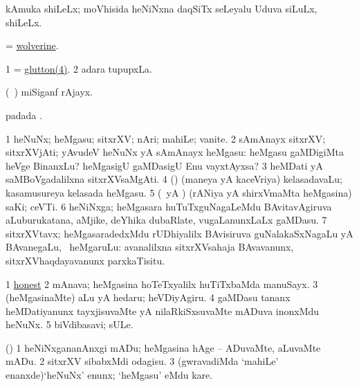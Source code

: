 \bentry
{} 
\gl{\nA}
\expl{}
\bmng
kAmuka shiLeLx; moVhisida heNiNxna daqSiTx seLeyalu Uduva siLuLx, shiLeLx. 
\emng
\eentry

\bentry
{} 
\gl{\nA}
\expl{}
\bmng
= \hyperlink{wolverine}{wolverine}. 
\emng
\eentry

\bentry
{} 
\gl{\nA}
\expl{}
\bmng
\bnum
\num{1} = \hyperref{kandict_g.pdf}{G}{glutton(4)}{glutton(4)}. 
\num{2} adara tupupxLa. 
\enum
\emng
\eentry

\bentry
{} 
\gl{\nA}
\expl{}
\bmng
(\kanu\ \ame) miSiganf rAjayx. 
\emng
\eentry

\bentry
{} 
\gl{\nA}
\expl{}
\bmng
{} padada \bava. 
\emng
\eentry

\bentry
{} 
\gl{\nA}
\bmng
\bnum
\num{1} heNuNx; heMgasu; sitxrXV; nAri; mahiLe; vanite. 
\num{2} sAmAnayx sitxrXV; sitxrXVjAti; yAvudeV heNuNx yA sAmAnayx heMgasu:  heMgasu gaMDigiMta heVge BinanxLu? heMgasigU gaMDasigU Enu vayxtAyxsa? 
\num{3} heMDati yA saMBoVgadalilxna sitxrXVsaMgAti. 
\num{4} (\AmA) (maneya yA kaceVriya) kelasadavaLu; kasamusureya kelasada heMgasu. 
\num{5} (\ca\ yA \pArxparx) (rANiya yA shirxVmaMta heMgasina) saKi; ceVTi. 
\num{6} heNiNxga; heMgasara huTuTxguNagaLeMdu BAvitavAgiruva aLuburukatana, aMjike, deYhika dubaRlate, \mo vugaLanunxLaLx gaMDasu. 
\num{7} sitxrXVtavx; heMgasaradedxMdu rUDhiyalilx BAvisiruva guNalakaSxNagaLu yA BAvanegaLu, \udA\ heMgaruLu:  avanalilxna sitxrXVsahaja BAvavanunx, sitxrXVhaqdayavanunx parxkaTisitu. 
\enum
\emng

\noindent
\gl{\pagu}
\expl{}
\bmng
\bnum
\num{1}  \hyperref{kandict_h.pdf}{H}{honest nuga}{honest}  
\num{2}  mAnava; heMgasina hoTeTxyalilx huTiTxbaMda manuSayx. 
\num{3}  (heMgasinaMte) aLu yA hedaru; heVDiyAgiru. 
\num{4}  gaMDasu tananx heMDatiyanunx tayxjisuvaMte yA nilaRkiSxsuvaMte mADuva inonxMdu heNuNx. 
\num{5}  biVdibasavi; sULe. 
\enum
\emng
\eentry

\bentry
{} 
\gl{\sakirx}
\expl{}
\bmng
(\pArxparx) 
\bnum
\num{1} heNiNxgananAnxgi mADu; heMgasina hAge -- ADuvaMte, aLuvaMte mADu. 
\num{2} sitxrXV sibabxMdi odagisu. 
\num{3} (gwravadiMda `mahiLe' enanxde)`heNuNx' enunx; `heMgasu' eMdu kare. 
\enum
\emng
\eentry

